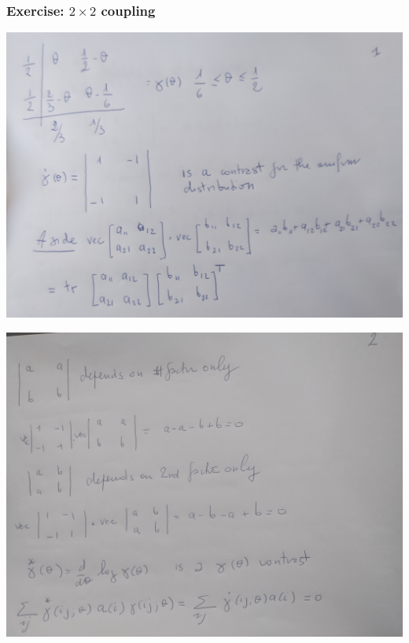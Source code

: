 \documentclass[xcolor=svgnames]{beamer}
\begin{document}
\begin{frame}\frametitle{Exercise: $2\times2$ coupling}

\includegraphics[width=\textwidth]{exercise/2x2-coupling-1.jpg}

\includegraphics[width=\textwidth]{exercise/2x2-coupling-2.jpg}
    
\end{frame}
\end{document}
